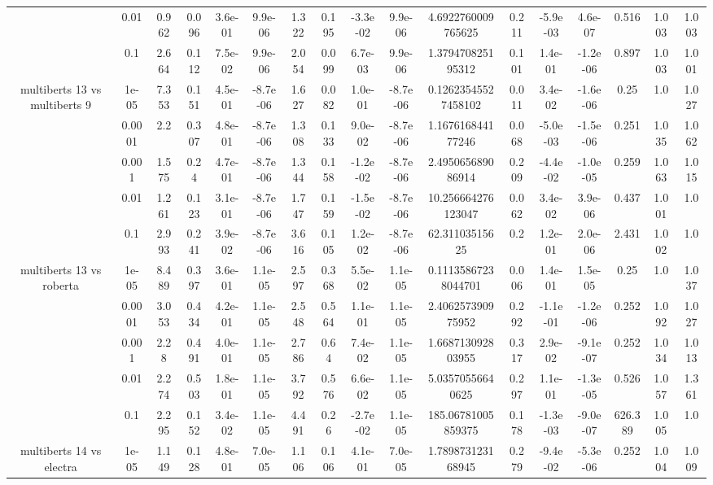 \begin{tabular}{|c|c|c|c|c|c|c|c|c|c|c|c|c|c|c|c|c|}
 & 0.01 & 0.962 & 0.096 & 3.6e-01 & 9.9e-06 & 1.322 & 0.195 & -3.3e-02 & 9.9e-06 & 4.6922760009765625 & 0.211 & -5.9e-03 & 4.6e-07 & 0.516 & 1.003 & 1.003 \\
 & 0.1 & 2.664 & 0.112 & 7.5e-02 & 9.9e-06 & 2.054 & 0.099 & 6.7e-03 & 9.9e-06 & 1.379470825195312 & 0.101 & 1.4e-01 & -1.2e-06 & 0.897 & 1.003 & 1.001 \\
\hline
\multirow{5}{*}{multiberts 13 vs multiberts 9} & 1e-05 & 7.353 & 0.151 & 4.5e-01 & -8.7e-06 & 1.627 & 0.082 & 1.0e-01 & -8.7e-06 & 0.12623545527458102 & 0.011 & 3.4e-02 & -1.6e-06 & 0.25 & 1.0 & 1.027 \\
 & 0.0001 & 2.2 & 0.307 & 4.8e-01 & -8.7e-06 & 1.308 & 0.133 & 9.0e-02 & -8.7e-06 & 1.167616844177246 & 0.068 & -5.0e-03 & -1.5e-06 & 0.251 & 1.035 & 1.062 \\
 & 0.001 & 1.575 & 0.24 & 4.7e-01 & -8.7e-06 & 1.344 & 0.158 & -1.2e-02 & -8.7e-06 & 2.495065689086914 & 0.209 & -4.4e-02 & -1.0e-05 & 0.259 & 1.063 & 1.015 \\
 & 0.01 & 1.261 & 0.123 & 3.1e-01 & -8.7e-06 & 1.747 & 0.159 & -1.5e-02 & -8.7e-06 & 10.256664276123047 & 0.062 & 3.4e-02 & 3.9e-06 & 0.437 & 1.001 & 1.0 \\
 & 0.1 & 2.993 & 0.241 & 3.9e-02 & -8.7e-06 & 3.616 & 0.105 & 1.2e-02 & -8.7e-06 & 62.31103515625 & 0.2 & 1.2e-01 & 2.0e-06 & 2.431 & 1.002 & 1.0 \\
\hline
\multirow{5}{*}{multiberts 13 vs roberta } & 1e-05 & 8.489 & 0.397 & 3.6e-01 & 1.1e-05 & 2.597 & 0.368 & 5.5e-02 & 1.1e-05 & 0.11135867238044701 & 0.006 & 1.4e-01 & 1.5e-05 & 0.25 & 1.0 & 1.037 \\
 & 0.0001 & 3.053 & 0.434 & 4.2e-01 & 1.1e-05 & 2.548 & 0.564 & 1.1e-01 & 1.1e-05 & 2.406257390975952 & 0.292 & -1.1e-01 & -1.2e-06 & 0.252 & 1.092 & 1.027 \\
 & 0.001 & 2.28 & 0.491 & 4.0e-01 & 1.1e-05 & 2.786 & 0.64 & 7.4e-02 & 1.1e-05 & 1.668713092803955 & 0.317 & 2.9e-02 & -9.1e-07 & 0.252 & 1.034 & 1.013 \\
 & 0.01 & 2.274 & 0.503 & 1.8e-01 & 1.1e-05 & 3.792 & 0.576 & 6.6e-02 & 1.1e-05 & 5.03570556640625 & 0.297 & 1.1e-01 & -1.3e-05 & 0.526 & 1.057 & 1.361 \\
 & 0.1 & 2.295 & 0.152 & 3.4e-02 & 1.1e-05 & 4.491 & 0.26 & -2.7e-02 & 1.1e-05 & 185.06781005859375 & 0.178 & -1.3e-03 & -9.0e-07 & 626.389 & 1.005 & 1.0 \\
\hline
\multirow{5}{*}{multiberts 14 vs electra } & 1e-05 & 1.149 & 0.128 & 4.8e-01 & 7.0e-05 & 1.106 & 0.106 & 4.1e-01 & 7.0e-05 & 1.789873123168945 & 0.279 & -9.4e-02 & -5.3e-06 & 0.252 & 1.004 & 1.009 \\

\end{tabular}
